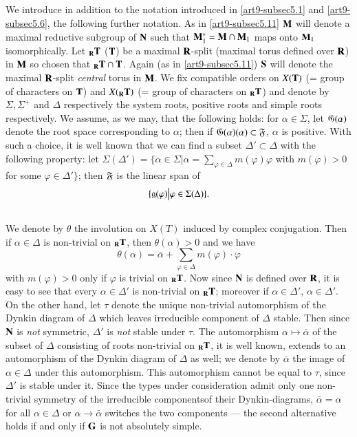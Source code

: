 \subsection{}\label{art9-subsec5.15}
We introduce in addition to the notation introduced in \ref{art9-subsec5.1} and  \ref{art9-subsec5.6}, the following further notation. As in \ref{art9-subsec5.11} $\mathbf{M}$ will denote a maximal reductive subgroup of $\mathbf{N}$ such that $\mathbf{M}^\ast_1 = \mathbf{M} \cap \mathbf{M}_1$ maps onto $\mathbf{M}_1$ isomorphically. Let ${}_{\mathbf{R}} \mathbf{T}$ (\resp $\mathbf{T}$) be a maximal $\mathbf{R}$-split (\resp maximal torus defined over $\mathbf{R}$) in $\mathbf{M}$ so chosen that ${}_{\mathbf{R}} \mathbf{T} \cap \mathbf{T}$. Again (as in \ref{art9-subsec5.11})  $\mathbf{S}$ will denote the maximal $\mathbf{R}$-split \textit{central} torus in $\mathbf{M}$. We fix compatible orders on $X (\mathbf{T})$ (= group of characters on $\mathbf{T}$) and $X({}_{\mathbf{R}} \mathbf{T})$ (= group of characters on ${}_{\mathbf{R}} \mathbf{T}$) and denote by $\Sigma,\Sigma^+$ and $\Delta$ respectively the system roots, positive roots and simple roots respectively. We assume, as we may, that the following holds: for $\alpha \in \Sigma$, let $\mathfrak{G} (\alpha)$ denote the root space corresponding to $\alpha$; then if $\mathfrak{G}(\alpha) (\alpha) \subset \mathfrak{F}$, $\alpha$ is positive. With such a choice, it is well known that we can find a subset $\Delta' \subset \Delta$ with the following property: let $\Sigma (\Delta') =\{\alpha \in \Sigma \big| \alpha = \sum\limits_{\varphi \in \Delta} m(\varphi) \varphi$ with $m(\varphi) >0$ for some $\varphi \in \Delta' \}$; then $\mathfrak{F}$ is the linear span of 
$$
\{\mathfrak{g} (\varphi) \big| \varphi \in \Sigma (\Delta)\}.
$$

\subsection{}\label{art9-subsec5.16}
We denote by $\theta$ the involution on $X (T)$ induced by complex conjugation. Then if $\alpha \in \Delta$ is non-trivial on ${}_{\mathbf{R}} \mathbf{T}$, then $\theta (\alpha) >0$ and we have 
$$
\theta(\alpha) = \bar{\alpha} + \sum\limits_{\varphi \in \Delta} m (\varphi) \cdot \varphi
$$
with $m(\varphi) > 0$ only if $\varphi$ is trivial on ${}_{\mathbf{R}} \mathbf{T}$. Now since $\mathbf{N}$ is defined over $\mathbf{R}$, it is easy to see that every $\alpha \in \Delta'$ is non-trivial on ${}_{\mathbf{R}} \mathbf{T}$; moreover if $\alpha \in \Delta'$, $\alpha \in \Delta'$. On the other hand, let $\tau$ denote the unique non-trivial automorphism of the Dynkin diagram of $\Delta$ which leaves irreducible component of $\Delta$ stable. Then since $\mathbf{N}$ is \textit{not} symmetric, $\Delta'$ is \textit{not} stable under $\tau$. The automorphism $\alpha \longmapsto \bar{\alpha}$ of the subset of $\Delta$ consisting of roots non-trivial on ${}_{\mathbf{R}} \mathbf{T}$, it is well known,  extends to an automorphism of the Dynkin diagram of $\Delta$ as well; we denote by $\bar{\alpha}$ the image of $\alpha\in \Delta$ under this automorphism. This automorphism cannot be equal to $\tau$, since $\Delta'$ is stable under it. Since the types under consideration admit only one non-trivial symmetry of the irreducible components\pageoriginale of their Dynkin-diagrams, $\bar{\alpha} = \alpha$ for all $\alpha \in \Delta$ or $\alpha \to \bar{\alpha}$ switches the two components --- the second alternative holds if and only if $\mathbf{G}$ is not absolutely simple.

